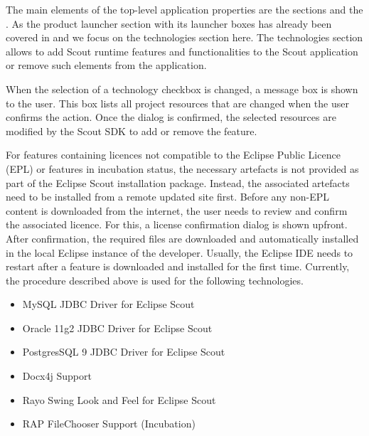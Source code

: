 \documentclass[a4paper,10pt,twoside]{book}
\begin{document}
The main elements of the top-level application properties are the sections  and the . 
As the product launcher section with its launcher boxes has already been covered in  and  we focus on the technologies section here.
The technologies section allows to add Scout runtime features and functionalities to the Scout application or remove such elements from the application. 

When the selection of a technology checkbox is changed, a message box is shown to the user. 
This box lists all project resources that are changed when the user confirms the action. 
Once the dialog is confirmed, the selected resources are modified by the Scout SDK to add or remove the feature. 

For features containing licences not compatible to the Eclipse Public Licence (EPL) or features in incubation status, the necessary artefacts is not provided as part of the Eclipse Scout installation package. 
Instead, the associated artefacts need to be installed from a remote updated site first. 
Before any non-EPL content is downloaded from the internet, the user needs to review and confirm the associated licence. 
For this, a license confirmation dialog is shown upfront. 
After confirmation, the required files are downloaded and automatically installed in the local Eclipse instance of the developer. 
Usually, the Eclipse IDE needs to restart after a feature is downloaded and installed for the first time. 
Currently, the procedure described above is used for the following technologies. 

\begin{itemize}
  \item MySQL JDBC Driver for Eclipse Scout
  \item Oracle 11g2 JDBC Driver for Eclipse Scout
  \item PostgresSQL 9 JDBC Driver for Eclipse Scout
  \item Docx4j Support
  \item Rayo Swing Look and Feel for Eclipse Scout
  \item RAP FileChooser Support (Incubation)
\end{itemize}
\end{document}
